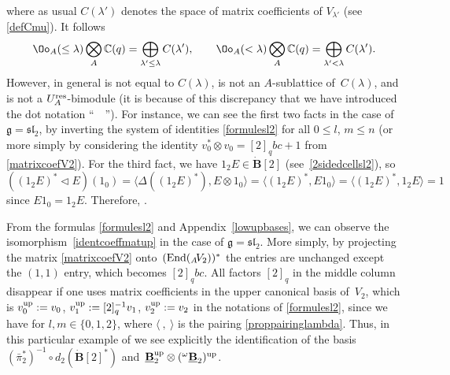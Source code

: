 where as usual $C(\lambda')$ denotes the space of matrix coefficients of $V_{\lambda'}$ (see \eqref{defCmu}). It follows
\begin{equation}\label{tensorCOA}
\Oo_A(\leq \lambda) \bigotimes_A {\mathbb C}(q)=\bigoplus_{\lambda'\leq \lambda}C(\lambda'), \qquad\Oo_A(<\lambda) \bigotimes_A {\mathbb C}(q)=\bigoplus_{\lambda'< \lambda}C(\lambda').
\end{equation}
However, in general  is not equal to $C(\lambda)$,  is not an $A$-sublattice of~$C(\lambda)$, and  is not a $U_A^{\rm res}$-bimodule (it is because of this discrepancy that we have introduced the dot notation ``\ \smash{${}^{\smallbullet}$}\ ''). For instance, we can see the first two facts in the case of $\mathfrak{g} = {\mathfrak{sl}_2}$, by inverting the system of identities \eqref{formulesl2} for all $0\leq l$, $m\leq n$ (or more simply by considering the identity $v_0^* \otimes v_0=[2]_qbc +1$ from \eqref{matrixcoefV2}). For the third fact, we have ${1_2 E\in \dot{\mathbf{B}} [2]}$ (see~\eqref{2sidedcellsl2}), so~${((1_2 E)^* \lhd E)(1_0) \!=\!\langle \Delta((1_2 E)^* ), E\otimes 1_0\rangle\!= \! \langle(1_2 E)^* , E1_0\rangle\!=\!\langle(1_2 E)^*, 1_2E\rangle\!=\!1}$ since $E1_0\! =\! 1_2E$. Therefore, .

From the formulas \eqref{formulesl2} and Appendix~\ref{lowupbases}, we can observe the isomorphism~\eqref{identcoeffmatup} in the case of $\mathfrak{g} = {\mathfrak{sl}_2}$. More simply, by projecting the matrix \eqref{matrixcoefV2} onto~$({\rm End}({}_A \!V_2))^*$ the entries are unchanged except the $(1,1)$ entry, which becomes $[2]_q bc$. All factors $[2]_q$ in the middle column disappear if one uses matrix coefficients in the upper canonical basis of~$V_2$, which is $v_0^{\rm up}:=v_0$, $v_1^{\rm up}:=[2]_q^{-1}v_1$, $v_2^{\rm up}:=v_2$ in the notations of \eqref{formulesl2}, since we have
 for $l,m\in \{0,1,2\}$, where $\langle\ ,\ \rangle$ is the pairing \eqref{proppairinglambda}. Thus, in this particular example of  we see explicitly the identification of the basis $(\bar{\pi}_2^*)^{-1} \circ d_2(\dot{\mathbf{B}} [2]^*)$ and~${\underline{\mathbf{B}}_2^{\rm up} \otimes ({}^{\omega}\underline{\mathbf{B}}_2)^{\rm up}}$.

